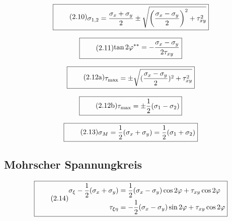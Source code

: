 \documentclass[11pt]{article}
\newcommand{\1}{ {\mathds{1}} }
\begin{document}
\begin{multicols}{2}
		\begin{equation}
			\boxed{
				\tag{2.10}
				\begin{split}
					\sigma_{1,2}
					=
					\frac{\sigma_x + \sigma_y}{2}
					\pm
					\sqrt{\left(
						\frac{\sigma_x - \sigma_y}{2}
						\right)^2
						+
						\tau_{xy}^2
					}
				\end{split}
			}
		\end{equation}

		\begin{equation}
			\boxed{
				\tag{2.11}
				\begin{split}
					\tan 2\varphi^{\ast\ast}
					=
					-\frac{\sigma_x - \sigma_y}{2 \tau_{xy}}
				\end{split}
			}
		\end{equation}

		\begin{equation}
			\boxed{
				\tag{2.12a}
				\begin{split}
					\tau_{\text{max}}
					=
					\pm
					\sqrt{(\frac{\sigma_x - \sigma_y}{2})^2 + \tau_{xy}^2}
				\end{split}
			}
		\end{equation}

		\begin{equation}
			\boxed{
				\tag{2.12b}
				\begin{split}
					\tau_{\text{max}}
					=
					\pm
					\frac{1}{2}(\sigma_1 -\sigma_2)
				\end{split}
			}
		\end{equation}

		\begin{equation}
			\boxed{
				\tag{2.13}
				\begin{split}
					\sigma_M
					=
					\frac{1}{2}(\sigma_x + \sigma_y)
					=
					\frac{1}{2}(\sigma_1 + \sigma_2)
				\end{split}
			}
		\end{equation}

		\subsection{Mohrscher Spannungkreis}

		\begin{equation}
			\boxed{
				\tag{2.14}
				\begin{split}
					\sigma_\xi-\frac{1}{2}(\sigma_x + \sigma_y)
					&=
					\frac{1}{2}(\sigma_x -\sigma_y)\cos 2\varphi + \tau_{xy}\cos 2 \varphi\\
					\tau_{\xi\eta}
					&=
					- \frac{1}{2}(\sigma_x - \sigma_y) \sin 2 \varphi + \tau_{xy} \cos 2\varphi
				\end{split}
			}
		\end{equation}		


\end{multicols}
\end{document}
